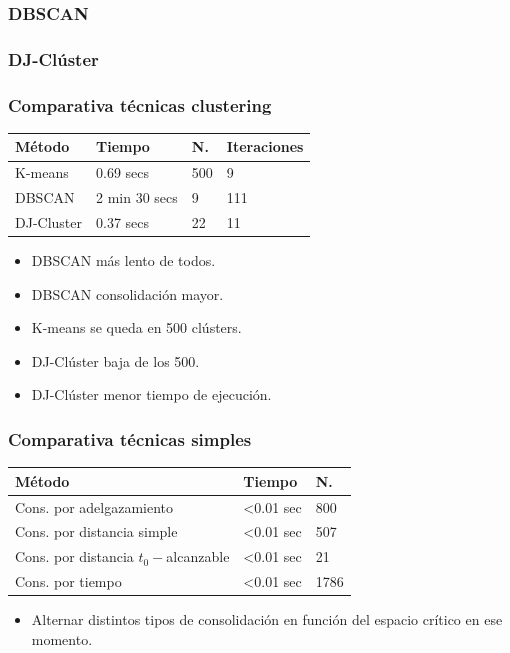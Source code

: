 \documentclass[10pt, spanish]{beamer}
\begin{document}
\begin{frame}[fragile]
\frametitle{DBSCAN}
\end{frame}

\begin{frame}[fragile]
\frametitle{DJ-Cl\'uster}
\end{frame}


\begin{frame}[fragile]
\frametitle{Comparativa t\'ecnicas clustering}
\begin{center}
\begin{tabular}{|l|l|l|l|}
	\hline
	\rowcolor{Gray}
	M\'etodo & Tiempo & N. & Iteraciones\\
	\hline	
	K-means & 0.69 secs & 500 & 9\\
	\hline
	DBSCAN &  2 min 30 secs & 9 & 111 \\
	\hline
	DJ-Cluster &  0.37 secs & 22  & 11\\
	\hline
\end{tabular}
\end{center}

\begin{itemize}
	\item DBSCAN m\'as lento de todos.
	\item DBSCAN consolidaci\'on mayor.
	\item K-means se queda en 500 cl\'usters.
	\item DJ-Cl\'uster baja de los 500.
	\item DJ-Cl\'uster menor tiempo de ejecuci\'on.
\end{itemize}

\end{frame}

\begin{frame}[fragile]
\frametitle{Comparativa t\'ecnicas simples}

\begin{center}
\begin{tabular}{|l|l|l|}
	\hline
	\rowcolor{Gray}
	M\'etodo & Tiempo & N. \\
	\hline	
	Cons. por adelgazamiento &  <0.01 sec & 800 \\
	\hline 
	Cons. por distancia simple &  <0.01 sec & 507 \\
	\hline
	Cons. por distancia $t_0-$alcanzable  &  <0.01 sec  & 21\\
	\hline
	Cons. por tiempo &  <0.01 sec  & 1786\\
	\hline
\end{tabular}
\end{center}

\begin{itemize}
	\item Alternar distintos tipos de consolidaci\'on en funci\'on del espacio cr\'itico en ese momento.
\end{itemize}
\end{frame}
\end{document}
